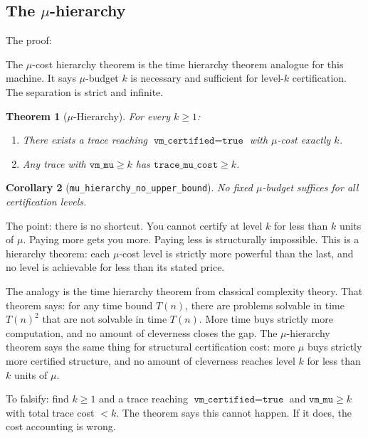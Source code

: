 \documentclass[11pt,a4paper]{article}
\theoremstyle{plain}
\newtheorem{theorem}{Theorem}[section]
\newtheorem{corollary}[theorem]{Corollary}
\theoremstyle{definition}
\theoremstyle{remark}
\begin{document}
\subsection{The \texorpdfstring{$\mu$}{mu}-hierarchy}

The proof:

The $\mu$-cost hierarchy theorem is the time hierarchy theorem analogue for this machine. It says $\mu$-budget $k$ is necessary and sufficient for level-$k$ certification. The separation is strict and infinite.

\begin{theorem}[$\mu$-Hierarchy]
For every $k \geq 1$:
\begin{enumerate}
\item There exists a trace reaching $\texttt{vm\_certified} = \texttt{true}$ with $\mu$-cost exactly $k$.
\item Any trace with $\texttt{vm\_mu} \geq k$ has $\texttt{trace\_mu\_cost} \geq k$.
\end{enumerate}
\end{theorem}

\begin{corollary}[\texttt{mu\_hierarchy\_no\_upper\_bound}]
No fixed $\mu$-budget suffices for all certification levels.
\end{corollary}

The point: there is no shortcut. You cannot certify at level $k$ for less than $k$ units of $\mu$. Paying more gets you more. Paying less is structurally impossible. This is a hierarchy theorem: each $\mu$-cost level is strictly more powerful than the last, and no level is achievable for less than its stated price.

The analogy is the time hierarchy theorem from classical complexity theory. That theorem says: for any time bound $T(n)$, there are problems solvable in time $T(n)^2$ that are not solvable in time $T(n)$. More time buys strictly more computation, and no amount of cleverness closes the gap. The $\mu$-hierarchy theorem says the same thing for structural certification cost: more $\mu$ buys strictly more certified structure, and no amount of cleverness reaches level $k$ for less than $k$ units of $\mu$.

To falsify: find $k \geq 1$ and a trace reaching $\texttt{vm\_certified} = \texttt{true}$ and $\texttt{vm\_mu} \geq k$ with total trace cost $< k$. The theorem says this cannot happen. If it does, the cost accounting is wrong.

\end{document}
